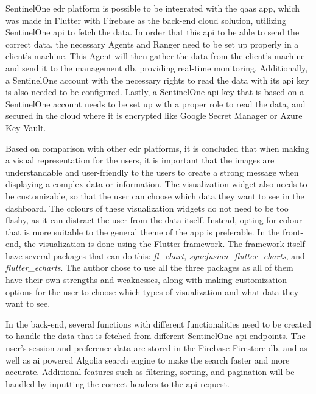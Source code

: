 SentinelOne \acrshort{edr} platform is possible to be integrated with the \acrshort{qaas} app, which was made in Flutter with
Firebase as the back-end cloud solution, utilizing SentinelOne \acrshort{api} to fetch the data. In order that this \acrshort{api}
to be able to send the correct data, the necessary Agents and Ranger need to be set up properly in a client's machine. This Agent will
then gather the data from the client's machine and send it to the management \acrshort{db}, providing real-time monitoring. Additionally,
a SentinelOne account with the necessary rights to read the data with its \acrshort{api} key is also needed to be configured. Lastly, a
SentinelOne \acrshort{api} key that is based on a SentinelOne account needs to be set up with a proper role to read the data, and secured
in  the cloud where it is encrypted like Google Secret Manager or Azure Key Vault.

Based on comparison with other \acrshort{edr} platforms, it is concluded that when making a visual representation for the users, it is
important that the images are understandable and user-friendly to the users to create a strong message when displaying a complex data
or information. The visualization widget also needs to be customizable, so that the user can choose which data they want to see in the
dashboard. The colours of these visualization widgets do not need to be too flashy, as it can distract the user from the data itself. Instead,
opting for colour that is more suitable to the general theme of the app is preferable. In the front-end, the visualization is done using the
Flutter framework. The framework itself have several packages that can do this: \textit{fl\_chart}, \textit{syncfusion\_flutter\_charts},
and \textit{flutter\_echarts}. The author chose to use all the three packages as all of them have their own strengths and weaknesses, along
with making customization options for the user to choose which types of visualization and what data they want to see.

In the back-end, several functions with different functionalities need to be created to handle the data that is fetched from different
SentinelOne \acrshort{api} endpoints. The user's session and preference data are stored in the Firebase Firestore \acrshort{db}, and as
well as \acrshort{ai} powered Algolia search engine to make the search faster and more accurate. Additional features such as filtering,
sorting, and pagination will be handled by inputting the correct headers to the \acrshort{api} request.


